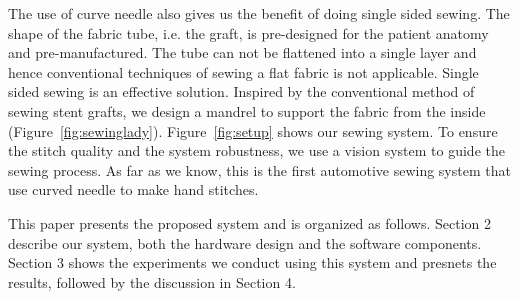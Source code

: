 
The use of curve needle also gives us the benefit of doing single sided sewing.
The shape of the fabric tube, i.e. the graft, is pre-designed for the patient anatomy and pre-manufactured. The tube can not be flattened into a single layer and hence conventional techniques of sewing a flat fabric is not applicable. Single sided sewing is an effective solution. Inspired by the conventional method of sewing stent grafts, we design a mandrel to support the fabric from the inside (Figure~\ref{fig:sewinglady}). Figure~\ref{fig:setup} shows our sewing system.
To ensure the stitch quality and the system robustness, we use a vision system to guide the sewing process. As far as we know, this is the first automotive sewing system that use curved needle to make hand stitches.

This paper presents the proposed system and is organized as follows. Section 2 describe our system, both the hardware design and the software components. Section 3 shows the experiments we conduct using this system and presnets the results, followed by the discussion in Section 4.



